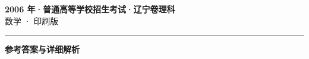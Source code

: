 \documentclass[zihao=5, a4paper]{ctexart}
\begin{document}
\begin{center}
  {\Large\bfseries 2006 年·普通高等学校招生考试·辽宁卷理科}\\[4pt]
  {\large 数学 · 印刷版}
\end{center}
\medskip
{}

\par\bigskip\hrule\bigskip
{}
\begin{center}{\large\bfseries 参考答案与详细解析}\end{center}
\smallskip

\end{document}

